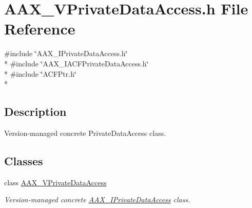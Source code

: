 \hypertarget{a00313}{}\section{A\+A\+X\+\_\+\+V\+Private\+Data\+Access.\+h File Reference}
\label{a00313}
{\ttfamily \#include \char`\"{}A\+A\+X\+\_\+\+I\+Private\+Data\+Access.\+h\char`\"{}}\\*
{\ttfamily \#include \char`\"{}A\+A\+X\+\_\+\+I\+A\+C\+F\+Private\+Data\+Access.\+h\char`\"{}}\\*
{\ttfamily \#include \char`\"{}A\+C\+F\+Ptr.\+h\char`\"{}}\\*


\subsection{Description}
Version-\/managed concrete Private\+Data\+Access class. 

\subsection*{Classes}
\begin{DoxyCompactItemize}
\item 
class \hyperlink{a00139}{A\+A\+X\+\_\+\+V\+Private\+Data\+Access}
\begin{DoxyCompactList}\small\item\em Version-\/managed concrete \hyperlink{a00111}{A\+A\+X\+\_\+\+I\+Private\+Data\+Access} class. \end{DoxyCompactList}\end{DoxyCompactItemize}
